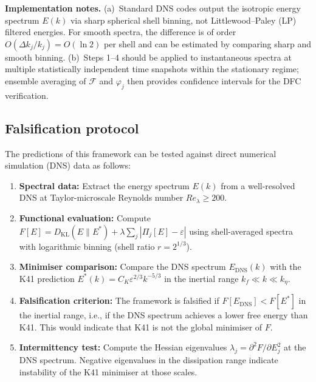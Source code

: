 \documentclass[12pt,a4paper]{article}
\theoremstyle{definition}
\theoremstyle{plain}
\theoremstyle{remark}
\begin{document}
\smallskip\noindent
\textbf{Implementation notes.}\;
(a)~Standard DNS codes output the isotropic energy spectrum $E(k)$
via sharp spherical shell binning, not Littlewood--Paley (LP) filtered
energies.  For smooth spectra, the difference is of order
$O(\Delta k_j / k_j) = O(\ln 2)$ per shell and can be estimated by
comparing sharp and smooth binning.
(b)~Steps 1--4 should be applied to instantaneous spectra at multiple
statistically independent time snapshots within the stationary regime;
ensemble averaging of $\mathcal{F}$ and $\varphi_j$ then provides
confidence intervals for the DFC verification.

\subsection{Falsification protocol}
\label{sec:falsification}

The predictions of this framework can be tested against direct numerical simulation (DNS) data as follows:

\begin{enumerate}
\item \textbf{Spectral data:} Extract the energy spectrum $E(k)$ from a well-resolved DNS at Taylor-microscale Reynolds number $Re_\lambda \geq 200$.

\item \textbf{Functional evaluation:} Compute $F[E] = D_{\mathrm{KL}}(E \| E^*) + \lambda \sum_j |\Pi_j[E] - \varepsilon|$ using shell-averaged spectra with logarithmic binning (shell ratio $r = 2^{1/3}$).

\item \textbf{Minimiser comparison:} Compare the DNS spectrum $E_{\mathrm{DNS}}(k)$ with the K41 prediction $E^*(k) = C_K \varepsilon^{2/3} k^{-5/3}$ in the inertial range $k_f \ll k \ll k_\eta$.

\item \textbf{Falsification criterion:} The framework is falsified if $F[E_{\mathrm{DNS}}] < F[E^*]$ in the inertial range, i.e., if the DNS spectrum achieves a lower free energy than K41. This would indicate that K41 is not the global minimiser of $F$.

\item \textbf{Intermittency test:} Compute the Hessian eigenvalues $\lambda_j = \partial^2 F / \partial E_j^2$ at the DNS spectrum. Negative eigenvalues in the dissipation range indicate instability of the K41 minimiser at those scales.
\end{enumerate}
\end{document}
